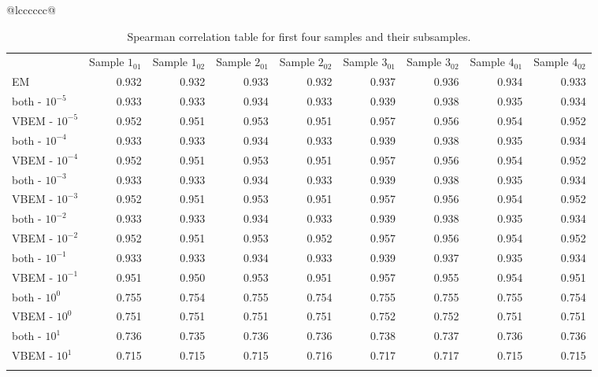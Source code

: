 \begin{table*}[t]
    \caption{Spearman correlation table for first four samples and their subsamples.
    \label{speartable}}
    \tabcolsep=0pt%
    \begin{tabular*}{\textwidth}{@{\extracolsep{\fill}}lcccccc@{\extracolsep{\fill}}}
    \toprule
    \begin{tabular}{lrrrrrrrr}
        \textbf{} &
          \multicolumn{1}{l}{Sample $1_{01}$} &
          \multicolumn{1}{l}{Sample $1_{02}$} &
          \multicolumn{1}{l}{Sample $2_{01}$} &
          \multicolumn{1}{l}{Sample $2_{02}$} &
          \multicolumn{1}{l}{Sample $3_{01}$} &
          \multicolumn{1}{l}{Sample $3_{02}$} &
          \multicolumn{1}{l}{Sample $4_{01}$} &
          \multicolumn{1}{l}{Sample $4_{02}$} \\
        EM           & 0.932 & 0.932 & 0.933 & 0.932 & 0.937 & 0.936 & 0.934 & 0.933 \\
        both - $10^{-5}$ & 0.933 & 0.933 & 0.934 & 0.933 & 0.939 & 0.938 & 0.935 & 0.934 \\
        VBEM - $10^{-5}$ & 0.952 & 0.951 & 0.953 & 0.951 & 0.957 & 0.956 & 0.954 & 0.952 \\
        both - $10^{-4}$ & 0.933 & 0.933 & 0.934 & 0.933 & 0.939 & 0.938 & 0.935 & 0.934 \\
        VBEM - $10^{-4}$ & 0.952 & 0.951 & 0.953 & 0.951 & 0.957 & 0.956 & 0.954 & 0.952 \\
        both - $10^{-3}$ & 0.933 & 0.933 & 0.934 & 0.933 & 0.939 & 0.938 & 0.935 & 0.934 \\
        VBEM - $10^{-3}$ & 0.952 & 0.951 & 0.953 & 0.951 & 0.957 & 0.956 & 0.954 & 0.952 \\
        both - $10^{-2}$ & 0.933 & 0.933 & 0.934 & 0.933 & 0.939 & 0.938 & 0.935 & 0.934 \\
        VBEM - $10^{-2}$ & 0.952 & 0.951 & 0.953 & 0.952 & 0.957 & 0.956 & 0.954 & 0.952 \\
        both - $10^{-1}$ & 0.933 & 0.933 & 0.934 & 0.933 & 0.939 & 0.937 & 0.935 & 0.934 \\
        VBEM - $10^{-1}$ & 0.951 & 0.950 & 0.953 & 0.951 & 0.957 & 0.955 & 0.954 & 0.951 \\
        both - $10^{0}$  & 0.755 & 0.754 & 0.755 & 0.754 & 0.755 & 0.755 & 0.755 & 0.754 \\
        VBEM - $10^{0}$  & 0.751 & 0.751 & 0.751 & 0.751 & 0.752 & 0.752 & 0.751 & 0.751 \\
        both - $10^{1}$  & 0.736 & 0.735 & 0.736 & 0.736 & 0.738 & 0.737 & 0.736 & 0.736 \\
        VBEM - $10^{1}$  & 0.715 & 0.715 & 0.715 & 0.716 & 0.717 & 0.717 & 0.715 & 0.715 \\
        \botrule    
    \end{tabular}
    
    \end{tabular*}
    \end{table*}